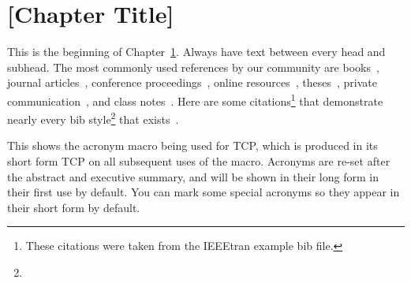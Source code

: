 \chapter{[Chapter Title]}\label{ch:common}

This is the beginning of Chapter~\ref{ch:common}. Always have text between every head
and subhead. The most commonly used references by our community are
   books~\cite{IEEEexample:book_typical},
   journal articles~\cite{IEEEexample:article_typical},
   conference proceedings~\cite{IEEEexample:conf_typical},
   online resources~\cite{IEEEhowto:IEEEtranpage},
   theses~\cite{IEEEexample:masters},
   private communication~\cite{IEEEexample:private}, and
   class notes~\cite{NPSexample:notes}.
Here are some citations\footnote{These citations were taken
from the IEEEtran example bib file.} that demonstrate nearly every bib 
style\footnote{\lipsum[10]} that exists~\cite{IEEEhowto:IEEEtranpage,
IEEEexample:shellCTANpage,IEEEexample:bibtexuser,IEEEexample:bibtexdesign,
IEEEexample:tamethebeast,IEEEexample:bibtexguide,
IEEEexample:article_typical,IEEEexample:articleetal,IEEEexample:conf_typical,
IEEEexample:book_typical,IEEEexample:articlelargepages,
IEEEexample:articledualmonths,IEEEexample:TBParticle,
IEEEexample:bookwitheditor,IEEEexample:book,IEEEexample:bookwithseriesvolume,
IEEEexample:inbook,IEEEexample:inbookpagesnote,IEEEexample:incollection,
IEEEexample:incollectionwithseries,IEEEexample:incollection_chpp,
IEEEexample:incollectionmanyauthors,
IEEEexample:motmanualhowpub,IEEEexample:confwithadddays,
IEEEexample:confwithvolume,IEEEexample:confwithpaper,
IEEEexample:confwithpapertype,IEEEexample:presentedatconf,
IEEEexample:masters,IEEEexample:masterstype,IEEEexample:phdurl,
IEEEexample:techrep,IEEEexample:techreptype,IEEEexample:techreptypeii,
IEEEexample:techrepstdsub,IEEEexample:unpublished,IEEEexample:electronhowinfo,
IEEEexample:electronhowinfo2,IEEEexample:electronorgadd,IEEEexample:uspat,
IEEEexample:jppat,IEEEexample:frenchpatreq,
IEEEexample:standard,IEEEexample:standardproposed,IEEEexample:draftasmisc,
IEEEexample:miscforum,IEEEexample:whitepaper,IEEEexample:datasheet,
IEEEexample:private,IEEEexample:miscrfc,IEEEexample:softmanual,
IEEEexample:softonline,IEEEexample:miscgermanreg,IEEEexample:bluebookstandard
}.

This shows the acronym macro being used for \ac{TCP}, which is
produced in its short form \ac{TCP} on all subsequent uses of the macro.
Acronyms are re-set after the abstract and executive summary, and will be
shown in their long form in their first use by default. You can mark some
special acronyms so they appear in their short form by default.

